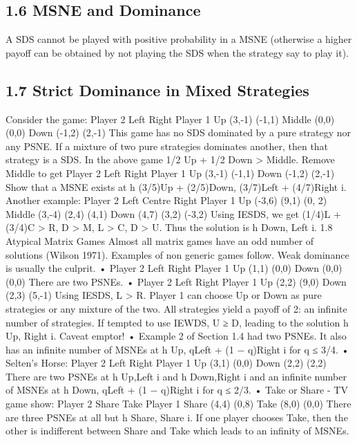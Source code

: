 \subsection{1.6 MSNE and Dominance}
A SDS cannot be played with positive probability in a MSNE (otherwise a higher payoff
can be obtained by not playing the SDS when the strategy say to play it).
\subsection{1.7 Strict Dominance in Mixed Strategies}
Consider the game:
Player 2
Left Right
Player 1
Up (3,-1) (-1,1)
Middle (0,0) (0,0)
Down (-1,2) (2,-1)
This game has no SDS dominated by a pure strategy nor any PSNE. If a mixture of two
pure strategies dominates another, then that strategy is a SDS.
In the above game 1/2 Up + 1/2 Down > Middle. Remove Middle to get
Player 2
Left Right
Player 1 Up (3,-1) (-1,1)
Down (-1,2) (2,-1)
Show that a MSNE exists at h (3/5)Up + (2/5)Down, (3/7)Left + (4/7)Right i.
Another example:
Player 2
Left Centre Right
Player 1
Up (-3,6) (9,1) (0, 2)
Middle (3,-4) (2,4) (4,1)
Down (4,7) (3,2) (-3,2)
Using IESDS, we get (1/4)L + (3/4)C > R, D > M, L > C, D > U. Thus the solution is
h Down, Left i.
1.8 Atypical Matrix Games
Almost all matrix games have an odd number of solutions (Wilson 1971). Examples of
non generic games follow. Weak dominance is usually the culprit.
•
Player 2
Left Right
Player 1 Up (1,1) (0,0)
Down (0,0) (0,0)
There are two PSNEs.
•
Player 2
Left Right
Player 1 Up (2,2) (9,0)
Down (2,3) (5,-1)
Using IESDS, L > R. Player 1 can choose Up or Down as pure strategies or any
mixture of the two. All strategies yield a payoff of 2: an infinite number of strategies.
If tempted to use IEWDS, U ≥ D, leading to the solution h Up, Right i. Caveat
emptor!
• Example 2 of Section 1.4 had two PSNEs. It also has an infinite number of MSNEs
at h Up, qLeft + (1 − q)Right i for q ≤ 3/4.
• Selten’s Horse:
Player 2
Left Right
Player 1 Up (3,1) (0,0)
Down (2,2) (2,2)
There are two PSNEs at h Up,Left i and h Down,Right i and an infinite number of
MSNEs at h Down, qLeft + (1 − q)Right i for q ≤ 2/3.
• Take or Share - TV game show:
Player 2
Share Take
Player 1 Share (4,4) (0,8)
Take (8,0) (0,0)
There are three PSNEs at all but h Share, Share i. If one player chooses Take, then
the other is indifferent between Share and Take which leads to an infinity of MSNEs.
